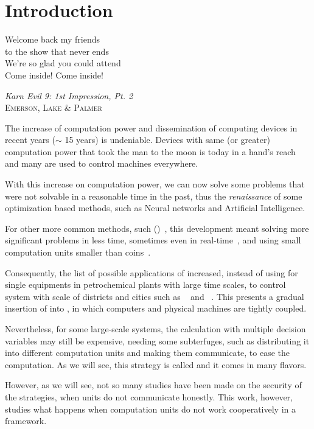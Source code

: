 \documentclass[../main.tex]{subfiles}
\begin{document}
\chapter{Introduction}\label{sec:introduction}
\epigraph{\centering Welcome back my friends\\ to the show that never ends\\
We’re so glad you could attend\\ Come inside! Come inside!}
{\textit{Karn Evil 9: 1st Impression, Pt. 2}\\\textsc{Emerson, Lake \& Palmer}}

The increase of computation power and dissemination of computing devices in recent years ($\sim$ 15 years) is undeniable.
Devices with same (or greater) computation power that took the man to the moon is today in a hand's reach and many are used to control machines everywhere.

With this increase on computation power, we can now solve some problems that were not solvable in a reasonable time in the past, thus the \emph{renaissance} of some optimization based methods, such as Neural networks and Artificial Intelligence.

For other more common methods, such \mpclong{} (\mpcshort)~\cite{GarciaEtAl1989}, this development meant solving more significant problems in less time, sometimes even in real-time~\cite{BesselmannEtAl2008}, and using small computation units smaller than coins~\cite{BanguraMahony2014}.

Consequently, the list of possible applications of \mpc{} increased, instead of using for single equipments in petrochemical plants with large time scales, to control system with scale of districts and cities such as \wdns~\cite{ZhangEtAl2021} and \dhns~\cite{TaylorEtAl2021}.
This presents a gradual insertion of \mpc{} into \cps{}, in which computers and physical machines are tightly coupled.

Nevertheless, for some large-scale systems, the calculation with multiple decision variables may still be expensive, needing some subterfuges, such as distributing it into different computation units and making them communicate, to ease the computation.
As we will see, this strategy is called \dmpc{} and it comes in many flavors.

However, as we will see, not so many studies have been made on the security of the \dmpc{} strategies, when units do not communicate honestly.
This work, however, studies what happens when computation units do not work cooperatively in a \dmpc{} framework.
\end{document}
